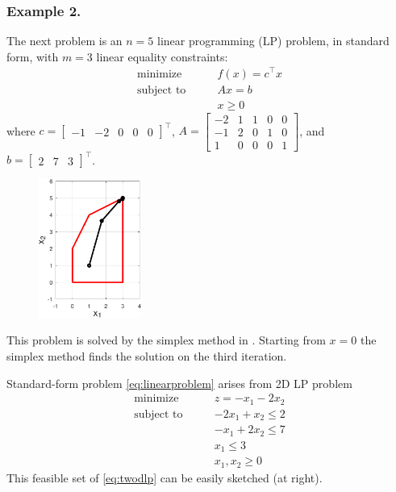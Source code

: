 \documentclass[11pt]{article}
\newcommand{\ds}{\displaystyle}
\begin{document}
\subsubsection*{Example 2.}

The next problem is an $n=5$ linear programming (LP) problem, in standard form, with $m=3$ linear equality constraints:
\begin{equation}
\begin{matrix}
\text{minimize} \qquad & f(x) = c^\top x \\
\text{subject to} \qquad & A x = b \\
 & x \ge 0
\end{matrix} \label{eq:linearproblem}
\end{equation}
where $\ds c = \begin{bmatrix} -1 & -2 & 0 & 0 & 0 \end{bmatrix}^\top$, $\ds A = \begin{bmatrix} -2 & 1 & 1 & 0 & 0 \\ -1 & 2 & 0 & 1 & 0 \\ 1 & 0 & 0 & 0 & 1 \end{bmatrix}$, and $\ds b = \begin{bmatrix} 2 & 7 & 3 \end{bmatrix}^\top$.

\begin{figure}
\phantom{x} \hfill \includegraphics[width=0.3\textwidth]{figs/linear.pdf}
\end{figure}

\medskip
This problem is solved by the simplex method in \cite[section 5.2]{GrivaNashSofer2009}.  Starting from $x=0$ the simplex method finds the solution on the third iteration.

Standard-form problem \eqref{eq:linearproblem} arises from 2D LP problem
\begin{equation}
\begin{matrix}
\text{minimize} \qquad & z = -x_1 - 2x_2 \\
\text{subject to} \qquad & -2x_1 + x_2 \le 2 \\
 & -x_1 + 2x_2 \le 7 \\
 & x_1 \le 3 \\
 & x_1, x_2 \ge 0
\end{matrix} \label{eq:twodlp}
\end{equation}
This feasible set of \eqref{eq:twodlp} can be easily sketched (at right).
\end{document}
